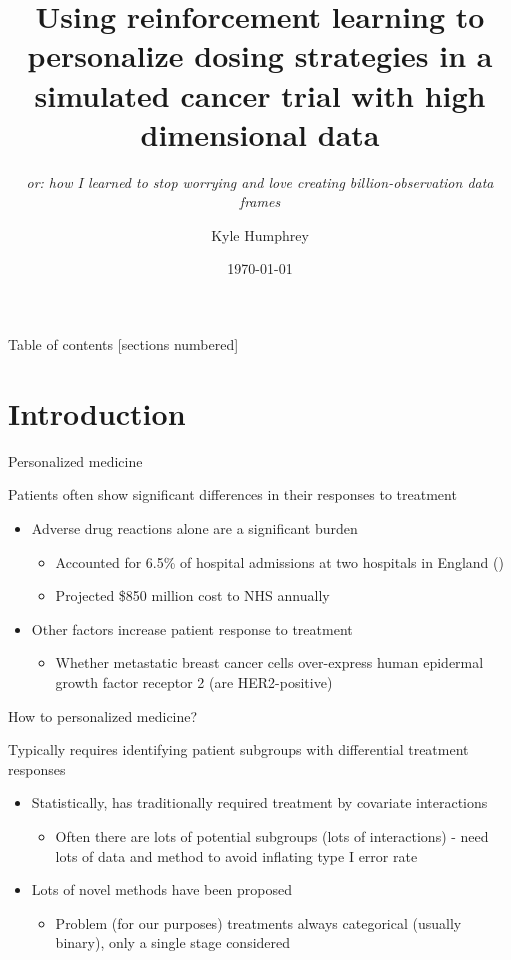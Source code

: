 \documentclass[handout]{beamer}
\title{Using reinforcement learning to personalize dosing strategies in a simulated cancer trial with high dimensional data}
\subtitle{\sl or: how I learned to stop worrying and love creating billion-observation data frames}
\date{\today}
\author{Kyle Humphrey}
\institute{University of Arizona}
\begin{document}
\maketitle

\begin{frame}[c]{Table of contents}
  [sections numbered]
  \tableofcontents
\end{frame}

\section{Introduction}

\begin{frame}[c]{Personalized medicine}

Patients often show significant differences in their responses to treatment
\begin{itemize}[<+(1)->]
  \item Adverse drug reactions alone are a significant burden 
  \begin{itemize}
    \item Accounted for 6.5\% of hospital admissions at two hospitals in England  (\cite{Pirmohamed2004})
    \item Projected \$850 million cost to NHS annually 
  \end{itemize}
  \item Other factors increase patient response to treatment
  \begin{itemize}
    \item Whether metastatic breast cancer cells over-express human epidermal growth factor receptor 2 (are HER2-positive)\footnotemark 
  \end{itemize}
\end{itemize}


\end{frame}

\begin{frame}[c]{How to personalized medicine?}

Typically requires identifying patient subgroups with differential treatment responses
\begin{itemize}[<+(1)->]
  \item Statistically, has traditionally required treatment by covariate interactions
  \begin{itemize}
    \item Often there are lots of potential subgroups (lots of interactions) - need lots of data and method to avoid inflating type I error rate
  \end{itemize}
  \item Lots of novel methods have been proposed
  \begin{itemize}
    \item Problem (for our purposes) treatments always categorical (usually binary), only a single stage considered
  \end{itemize}
\end{itemize}

\end{frame}
\end{document}
